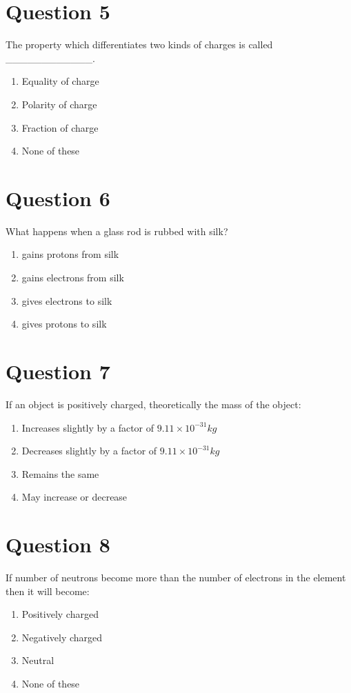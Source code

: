 \documentclass{article}
\begin{document}
\section*{Question 5}
The property which differentiates two kinds of charges is called ____________.
\begin{enumerate}[label=(\alph*)]
\item Equality of charge
\item Polarity of charge
\item Fraction of charge
\item None of these
\end{enumerate}
\newpage
\section*{Question 6}
What happens when a glass rod is rubbed with silk?
\begin{enumerate}[label=(\alph*)]
\item gains protons from silk
\item gains electrons from silk
\item gives electrons to silk
\item gives protons to silk
\end{enumerate}
\newpage
\section*{Question 7}
If an object is positively charged, theoretically the mass of the object:
\begin{enumerate}[label=(\alph*)]
\item Increases slightly by a factor of \(9.11 \times 10^{-31} kg\)
\item Decreases slightly by a factor of \(9.11 \times 10^{-31} kg\)
\item Remains the same
\item May increase or decrease
\end{enumerate}
\newpage
\section*{Question 8}
If number of neutrons become more than the number of electrons in the element then it will become:
\begin{enumerate}[label=(\alph*)]
\item Positively charged
\item Negatively charged
\item Neutral
\item None of these
\end{enumerate}
\newpage
\end{document}
